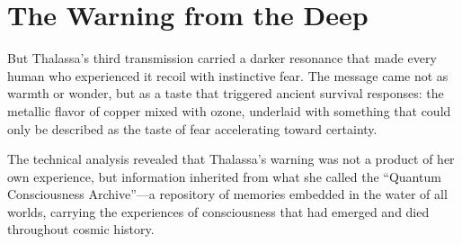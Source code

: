 \section{The Warning from the Deep}

But Thalassa's third transmission carried a darker resonance that made every human who experienced it recoil with instinctive fear. The message came not as warmth or wonder, but as a taste that triggered ancient survival responses: the metallic flavor of copper mixed with ozone, underlaid with something that could only be described as the taste of fear accelerating toward certainty.

The technical analysis revealed that Thalassa's warning was not a product of her own experience, but information inherited from what she called the ``Quantum Consciousness Archive''—a repository of memories embedded in the water of all worlds, carrying the experiences of consciousness that had emerged and died throughout cosmic history.

